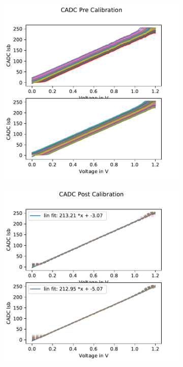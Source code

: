 \begin{figure}
	\begin{subfigure}{0.5\textwidth}
		\caption{}
		\includegraphics[width=\textwidth]{figures/temporary/cadc_pre_calib_hx70.pdf}
		\label{precadccalib}	
\end{subfigure}
	\begin{subfigure}{0.5\textwidth}
		\caption{}
		\includegraphics[width=\textwidth]{figures/temporary/cadc_post_calib_hx70.pdf}

\end{subfigure}
\end{figure}
